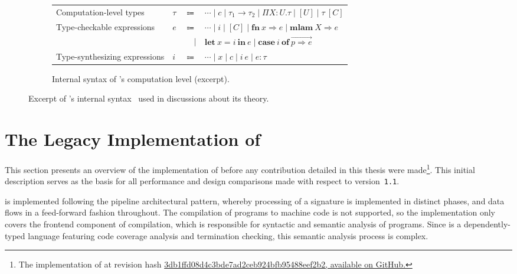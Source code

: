 \begin{figure}
\begin{subfigure}{\linewidth}
\begin{tabular}{p{5.5cm} >{\raggedleft}p{1cm} r l}
Computation-level types & $\tau$ & $\Coloneqq$ & $\cdots \mid c \mid \tau_1 \to \tau_2 \mid \Pi X{:}U. \tau \mid [U] \mid \tau\ [C]$\\
Type-checkable expressions & $e$ & $\Coloneqq$ & $\cdots \mid i \mid [C] \mid \mathbf{fn}\ x \Rightarrow e \mid \mathbf{mlam}\ X \Rightarrow e$ \\
& & $|$ & $\mathbf{let}\ x = i\ \mathbf{in}\ e \mid \mathbf{case}\ i\ \mathbf{of}\ \overrightarrow{p \Rightarrow e}$\\
Type-synthesizing expressions & $i$ & $\Coloneqq$ & $\cdots \mid x \mid c \mid i \ e \mid e : \tau$
\end{tabular}
\caption{Internal syntax of \Beluga's computation level (excerpt).}
\end{subfigure}
\caption[Excerpt of \Beluga's internal syntax]{%
Excerpt of \Beluga's internal syntax~\cite{nanevski2008contextual, germain2010implementation, cave2013first, ferreira2013compiling} used in discussions about its theory.
}
\label{figure:internal-syntax}
\end{figure}

\section{The Legacy Implementation of \Beluga} \label{section:beluga-implementation}

This section presents an overview of the implementation of \Beluga before any contribution detailed in this thesis were made\footnote{The implementation of \Beluga at revision hash \href{https://github.com/Beluga-lang/Beluga/tree/3db1ffd08d4c3bde7ad2ceb924bfb95488eef2b2}{3db1ffd08d4c3bde7ad2ceb924bfb95488eef2b2, available on GitHub.}}.
This initial description serves as the basis for all performance and design comparisons made with respect to \Beluga version~\texttt{1.1}.

\Beluga is implemented following the pipeline architectural pattern, whereby processing of a \Beluga signature is implemented in distinct phases, and data flows in a feed-forward fashion throughout.
The compilation of \Beluga programs to machine code is not supported, so the implementation only covers the frontend component of compilation, which is responsible for syntactic and semantic analysis of programs.
Since \Beluga is a dependently-typed language featuring code coverage analysis and termination checking, this semantic analysis process is complex.

